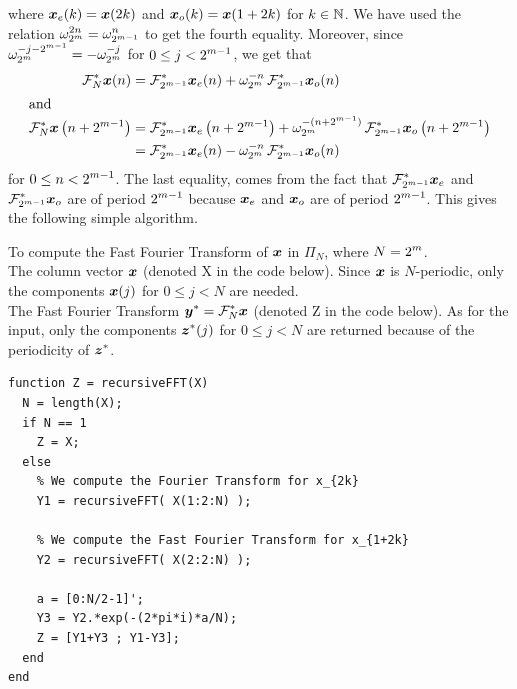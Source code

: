 \begin{rmkList}
\begin{enumerate}
where $\bm{x}_{e}(k) = \bm{x}(2k)$ and $\bm{x}_{o}(k) = \bm{x}(1+2k)$
for $k \in \mathbb{N}$.  We have used the relation
$\displaystyle \omega_{2^m}^{2n} = \omega_{2^{m-1}}^n$ to
get the fourth equality.  Moreover, since
$\displaystyle \omega_{2^m}^{-j-2^{m-1}} = -\omega_{2^m}^{-j}$ for
$\displaystyle 0 \leq j < 2^{m-1}$, we get that
\begin{align*}
\mathcal{F}^\ast_N \bm{x}(n)
&= \mathcal{F}^\ast_{2^{m-1}} \bm{x}_{e}(n) + \omega_{2^m}^{-n} \,
\mathcal{F}^\ast_{2^{m-1}} \bm{x}_{o}(n) \\
\intertext{and}
\mathcal{F}^\ast_N \bm{x} \left(n+2^{m-1}\right)
&= \mathcal{F}^\ast_{2^{m-1}} \bm{x}_{e} \left(n+2^{m-1}\right)
+ \omega_{2^m}^{-(n+2^{m-1})} \, \mathcal{F}^\ast_{2^{m-1}}
\bm{x}_{o}\left(n+2^{m-1}\right) \\
&= \mathcal{F}^\ast_{2^{m-1}} \bm{x}_{e}(n) -
\omega_{2^m}^{-n} \, \mathcal{F}^\ast_{2^{m-1}} \bm{x}_{o}(n)
\end{align*}
for $\displaystyle 0 \leq n < 2^{m-1}$.  The last equality, comes from
the fact that $\displaystyle \mathcal{F}^\ast_{2^{m-1}} \bm{x}_{e}$ and
$\displaystyle \mathcal{F}^\ast_{2^{m-1}} \bm{x}_{o}$ are of period
$\displaystyle 2^{m-1}$ because $\bm{x}_{e}$ and $\bm{x}_{o}$ are of
period $\displaystyle 2^{m-1}$.  This gives the following simple algorithm.

\begin{code}
To compute the Fast Fourier Transform of $\bm{x}$ in $\Pi_N$, where
$\displaystyle N=2^m$. \\
 The column vector $\bm{x}$ (denoted X in the code
below).  Since $\bm{x}$ is $N$-periodic, only the
components $\bm{x}(j)$ for $0 \leq j < N$ are needed.\\
 The Fast Fourier Transform
$\displaystyle \bm{y}^\ast= \mathcal{F}^\ast_N \bm{x}$
(denoted Z in the code below).  As for the input, only the 
components $\displaystyle \bm{z}^\ast(j)$ for $0 \leq j < N$ are
returned because of the periodicity of $\displaystyle \bm{z}^\ast$.
\small
\begin{verbatim}
function Z = recursiveFFT(X)
  N = length(X);
  if N == 1
    Z = X;
  else
    % We compute the Fourier Transform for x_{2k}
    Y1 = recursiveFFT( X(1:2:N) );

    % We compute the Fast Fourier Transform for x_{1+2k}
    Y2 = recursiveFFT( X(2:2:N) );

    a = [0:N/2-1]';
    Y3 = Y2.*exp(-(2*pi*i)*a/N);
    Z = [Y1+Y3 ; Y1-Y3];
  end
end
\end{verbatim}
\end{code}

\end{enumerate}
\end{rmkList}

